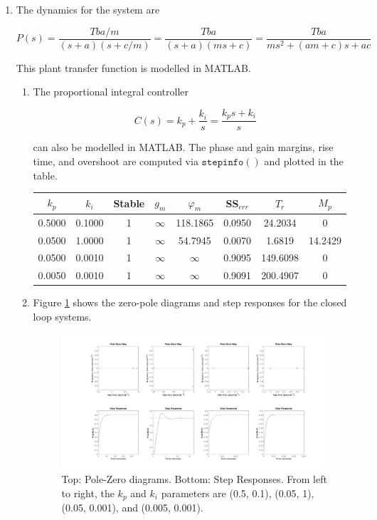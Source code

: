 \documentclass[11pt]{article}
\theoremstyle{definition}
\begin{document}
\begin{enumerate}
    \item %
    The dynamics for the system are

    $$ P(s) = \frac{Tba/m}{(s+a)(s+c/m)} = \frac{Tba}{(s + a)(ms + c)} = \frac{Tba}{ms^2 + (am + c)s + ac} $$

    This plant transfer function is modelled in MATLAB.

    \begin{enumerate}
        \item %
        The proportional integral controller

        $$C(s) = k_p + \frac{k_i}{s} = \frac{k_p s + k_i}{s} $$

        can also be modelled in MATLAB.  The phase and gain margins, rise time, and overshoot are computed via $\mathtt{stepinfo()}$ and plotted in the table.

        \begin{center}
        \begin{tabular}{|c c|c c c c c c|}
        \hline
        $k_p$ & $k_i$ & Stable & $g_m$ & $\varphi_m$ & SS$_{err}$ & $T_r$ & $M_p$ \\
        \hline
            0.5000 &   0.1000 &   1 &      $\infty$ &      118.1865 &   0.0950 &  24.2034 &        0 \\
            0.0500 &   1.0000 &   1 &      $\infty$ &       54.7945 &   0.0070 &   1.6819 &  14.2429 \\
            0.0500 &   0.0010 &   1 &      $\infty$ &      $\infty$ &   0.9095 & 149.6098 &        0 \\
            0.0050 &   0.0010 &   1 &      $\infty$ &      $\infty$ &   0.9091 & 200.4907 &        0 \\
        \hline
        \end{tabular}
        \end{center}

        \item %
        Figure \ref{fig:4bplots} shows the zero-pole diagrams and step responses for the closed loop systems.  

        \begin{figure}[H]
            \centering
            \includegraphics[width = \textwidth]{ES155P7_4b_plots.jpg}
            \caption{Top: Pole-Zero diagrams.  Bottom: Step Responses.  From left to right, the $k_p$ and $k_i$ parameters are (0.5, 0.1), (0.05, 1), (0.05, 0.001), and (0.005, 0.001).}
            \label{fig:4bplots}
        \end{figure}


\end{enumerate}
\end{enumerate}
\end{document}
